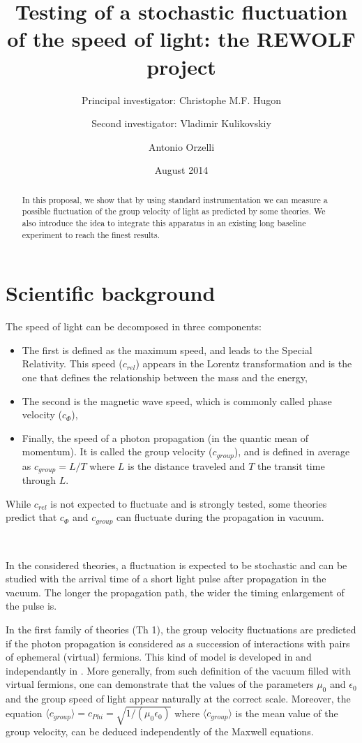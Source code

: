 \documentclass[9pt, a4, twoside]{article}
\title{Testing of a stochastic fluctuation of the speed of light: the REWOLF project}
\author[1]{Principal investigator: Christophe M.F. Hugon}
\author[2]{Second investigator: Vladimir Kulikovskiy}
\author[1]{Antonio Orzelli}
\affil[1]{INFN, Sezione di Genova}
\affil[2]{INFN, Laboratori Nazionali del Sud}
\date{August 2014}
\begin{document}
\maketitle
\begin{abstract}
In this proposal, we show that by using standard instrumentation we can measure a possible fluctuation of the group velocity of light as predicted by some theories. We also introduce the idea to integrate this apparatus in an existing long baseline experiment to reach the finest results.
\end{abstract}

\section{Scientific background}

The speed of light can be decomposed in three components:
\begin {itemize}
\item The first is defined as the maximum speed, and leads to the Special Relativity. This speed ($c_{rel}$) appears in the Lorentz transformation and is the one that defines the relationship between the mass and the energy,
\item The second is the magnetic wave speed, which is commonly called phase velocity ($c_{\Phi}$),
\item Finally, the speed of a photon propagation (in the quantic mean of momentum). It is called the group velocity ($c_{group}$), and is defined in average as $c_{group}=L/T$ where $L$ is the distance traveled and $T$ the transit time through $L$.
\end {itemize}
While $c_{rel}$ is not expected to fluctuate and is strongly tested, some theories predict that $c_{\Phi}$ and $c_{group}$ can fluctuate during the propagation in vacuum.

~

In the considered theories, a fluctuation is expected to be stochastic and can be studied with the arrival time of a short light pulse after propagation in the vacuum. The longer the propagation path, the wider the timing enlargement of the pulse is.

In the first family of theories (Th 1), the group velocity fluctuations are predicted if the photon propagation is considered as a succession of interactions with pairs of ephemeral (virtual) fermions. This kind of model is developed in \cite{baseTh} and independantly  in \cite{baseTh2}. More generally, from such definition of the vacuum filled with virtual fermions, one can demonstrate that the values of the parameters $\mu_0$ and $\epsilon_0$ and the group speed of light appear naturally at the correct scale. Moreover, the equation $\langle c_{group}\rangle  = c_{Phi} = \sqrt{1/(\mu_0\epsilon_0)}$ where $\langle c_{group}\rangle$ is the mean value of the group velocity, can be deduced independently of the Maxwell equations.
\end{document}
